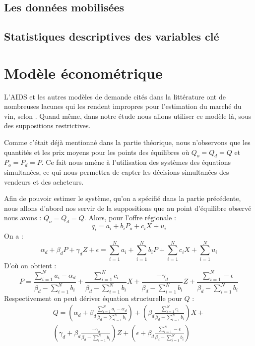 \documentclass[11pt, a4paper]{article}
\begin{document}
\subsection*{Les données mobilisées}


\subsection*{Statistiques descriptives des variables clé}

\section*{Modèle économétrique}
L'AIDS et les autres modèles de demande cités dans la littérature ont de nombreuses lacunes qui les rendent impropres pour l'estimation du marché du vin, selon \citet{cembalo2014}. 
Quand même, dans notre étude nous allons utiliser ce modèle là, sous des suppositions restrictives. 
\par
Comme c'était déjà mentionné dans la partie théorique, nous n'observons que les quantités et les prix moyens pour les points des équilibres où $Q_o = Q_d = Q$ et $P_o = P_d = P$.
Ce fait nous amène à l'utilisation des systèmes des équations simultanées, ce qui nous permettra de capter les décisions simultanées des vendeurs et des acheteurs. 
\par 
Afin de pouvoir estimer le système, qu'on a spécifié dans la partie précédente, nous allons d'abord nos servir de la suppositions que au point d'équilibre observé nous avons : $Q_o = Q_d = Q$.
Alors, pour l'offre régionale :
\begin{equation}
    q_i = a_i + b_i P_o + c_i X + u_i
\end{equation} 
On a :
\begin{equation}
    \alpha_d + \beta_d P + \gamma_d Z + \epsilon = 
        \sum_{i = 1}^{N} a_i + \sum_{i = 1}^{N} b_i P + \sum_{i = 1}^{N} c_i X + \sum_{i = 1}^{N} u_i
\end{equation}
D'où on obtient :
\begin{equation}
    P = \frac{\sum_{i = 1}^{N} a_i - \alpha_d}{\beta_d - \sum_{i = 1}^{N} b_i} + 
        \frac{\sum_{i = 1}^{N} c_i}{\beta_d - \sum_{i = 1}^{N} b_i} X +
        \frac{-\gamma_d}{\beta_d - \sum_{i = 1}^{N} b_i} Z + 
        \frac{\sum_{i = 1}^{N} - \epsilon}{\beta_d - \sum_{i = 1}^{N} b_i}
\end{equation}
Respectivement on peut dériver équation structurelle pour $Q$ :
\begin{multline}
    Q = (\alpha_d + \beta_d \frac{\sum_{i = 1}^{N} a_i - \alpha_d}{\beta_d - \sum_{i = 1}^{N} b_i}) + 
        (\beta_d \frac{\sum_{i = 1}^{N} c_i}{\beta_d - \sum_{i = 1}^{N} b_i}) X + \\
        (\gamma_d + \beta_d \frac{-\gamma_d}{\beta_d - \sum_{i = 1}^{N} b_i}) Z + 
        (\epsilon + \beta_d \frac{\sum_{i = 1}^{N} - \epsilon}{\beta_d - \sum_{i = 1}^{N} b_i})
\end{multline}
\end{document}
